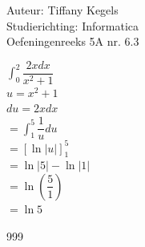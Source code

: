 \documentclass[a4paper]{article}
\begin{document}
  
\noindent \large Auteur: Tiffany Kegels \\
\noindent \large Studierichting: Informatica\\
\noindent \large Oefeningenreeks 5A nr. 6.3
\\

\medskip

\normalsize


$\displaystyle\int_{0}^{2} \dfrac{2xdx}{x^2 + 1}  $\\

$u = x^2 + 1$\\

$du = 2x dx$\\

$=\displaystyle\int_{1}^{5} \dfrac{1}{u}du  $\\

$= \left[\ln |u|\right]_{1}^{5}$\\

$= \ln |5| - \ln |1|$\\

$ = \ln \left(\dfrac{5}{1}\right)$\\

$= \ln 5$

















\begin{thebibliography}{999}
\end{thebibliography}
\end{document}
